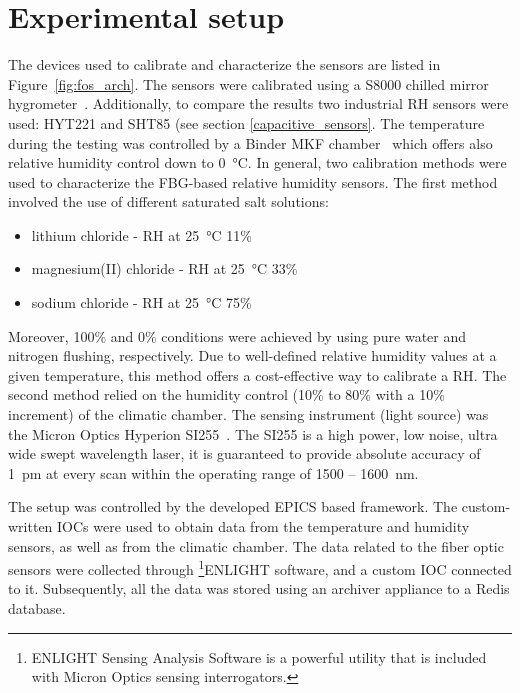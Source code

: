 \section{Experimental setup}
\label{fos:setup}
The devices used to calibrate and characterize the sensors are listed in Figure~\ref{fig:fos_arch}. The sensors were calibrated using a S8000 chilled mirror hygrometer~\cite{michell_s8000}. Additionally, to compare the results two industrial \gls{RH} sensors were used: HYT221 and SHT85 (see section \ref{capacitive_sensors}. The temperature during the testing was controlled by a Binder MKF chamber~\cite{binder} which offers also relative humidity control down to \SI{0}{\celsius}. 
In general, two calibration methods were used to characterize the \gls{FBG}-based relative humidity sensors. The first method involved the use of different saturated salt solutions:
\begin{itemize}
    \item lithium chloride - \gls{RH} at \SI{25}{\celsius} 11\%
    \item magnesium(II) chloride - \gls{RH} at \SI{25}{\celsius} 33\%
    \item sodium chloride - \gls{RH} at \SI{25}{\celsius} 75\%
\end{itemize}
Moreover, 100\% and 0\% conditions were achieved by using pure water and nitrogen flushing, respectively. Due to well-defined relative humidity values at a given temperature, this method offers a cost-effective way to calibrate a \gls{RH}. The second method relied on the humidity control (10\% to 80\% with a 10\% increment) of the climatic chamber.  The sensing instrument (light source) was the Micron Optics Hyperion SI255~\cite{si255}. The SI255 is a high power, low noise, ultra wide swept wavelength laser, it is guaranteed to provide absolute accuracy of 1~pm at every scan within the operating range of 1500 -- 1600~nm. 

The setup was controlled by the developed \gls{EPICS} based framework. The custom-written \glspl{IOC} were used to obtain data from the temperature and humidity sensors, as well as from the climatic chamber. The data related to the fiber optic sensors were collected through \footnote{ENLIGHT Sensing Analysis Software is a powerful utility that is included with Micron
Optics sensing interrogators.}{ENLIGHT} software, and a custom \gls{IOC} connected to it. Subsequently, all the data was stored using an archiver appliance to a Redis database. 

